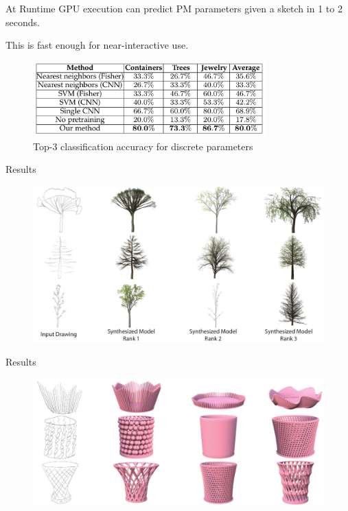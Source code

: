 \documentclass{beamer}
\begin{document}
    \begin{frame}{At Runtime}
        GPU execution can predict PM parameters given a sketch in 1 to 2 seconds. 
        
        This is fast enough for near-interactive use.
        
        \begin{figure}
            \centering
            \includegraphics[width=0.8\textwidth]{images/table.jpg}
            \caption{Top-3 classification accuracy for discrete parameters}
            \label{fig:table}
        \end{figure}
    \end{frame}

    \begin{frame}{Results}
        \begin{figure}
            \centering
            \includegraphics[width=\textwidth]{images/trees.jpg}
            \label{fig:trees}
        \end{figure}
    \end{frame}
    
    \begin{frame}{Results}
        \begin{figure}
            \centering
            \includegraphics[width=\textwidth]{images/containers.jpg}
            \label{fig:containers}
        \end{figure}
    \end{frame}
  
\end{document}
